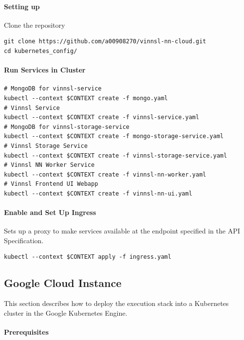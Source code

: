 \paragraph{Setting up}\label{setting-up}

Clone the repository

\begin{verbatim}
git clone https://github.com/a00908270/vinnsl-nn-cloud.git
cd kubernetes_config/
\end{verbatim}

\paragraph{Run Services in Cluster}\label{run-services-in-cluster}

\begin{verbatim}
# MongoDB for vinnsl-service
kubectl --context $CONTEXT create -f mongo.yaml 
# Vinnsl Service
kubectl --context $CONTEXT create -f vinnsl-service.yaml
# MongoDB for vinnsl-storage-service
kubectl --context $CONTEXT create -f mongo-storage-service.yaml
# Vinnsl Storage Service
kubectl --context $CONTEXT create -f vinnsl-storage-service.yaml
# Vinnsl NN Worker Service
kubectl --context $CONTEXT create -f vinnsl-nn-worker.yaml
# Vinnsl Frontend UI Webapp
kubectl --context $CONTEXT create -f vinnsl-nn-ui.yaml
\end{verbatim}

\paragraph{Enable and Set Up Ingress}\label{enable-and-set-up-ingress}

Sets up a proxy to make services available at the endpoint specified in
the API Specification.

\begin{verbatim}
kubectl --context $CONTEXT apply -f ingress.yaml
\end{verbatim}

\subsection{Google Cloud Instance}\label{google-cloud-instance}

This section describes how to deploy the execution stack into a
Kubernetes cluster in the Google Kubernetes Engine.

\paragraph{Prerequisites}\label{prerequisites-2}


